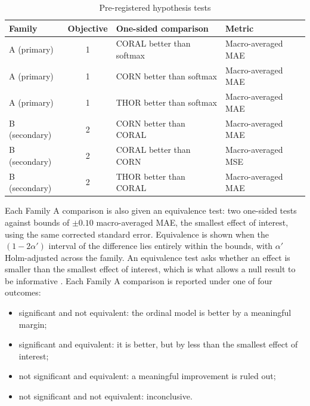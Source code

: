 \documentclass{icsthesis}
\begin{document}
\begin{mainmatter}
					\begin{table}[htbp]
					\vspace{4ex}
					\centering
						\caption{Pre-registered hypothesis tests}
						\label{tab:hypotheses}
						\begin{tabular}{lcll}
						\hline
						\hline
						Family & Objective & One-sided comparison & Metric \\ \hline
						A (primary) & 1 & CORAL better than softmax & Macro-averaged MAE \\
						A (primary) & 1 & CORN better than softmax & Macro-averaged MAE \\
						A (primary) & 1 & THOR better than softmax & Macro-averaged MAE \\
						B (secondary) & 2 & CORN better than CORAL & Macro-averaged MAE \\
						B (secondary) & 2 & CORAL better than CORN & Macro-averaged MSE \\
						B (secondary) & 2 & THOR better than CORAL & Macro-averaged MAE
						\\ \hline\hline
						\end{tabular}
					\vspace{4ex}
					\end{table}

					Each Family A comparison is also given an equivalence test: two one-sided tests
					against bounds of $\pm 0.10$ macro-averaged MAE, the smallest effect of
					interest, using the same corrected standard error. Equivalence is shown when the
					$(1-2\alpha')$ interval of the difference lies entirely within the bounds, with
					$\alpha'$ Holm-adjusted across the family. An equivalence test asks whether an
					effect is smaller than the smallest effect of interest, which is what allows a
					null result to be informative \citep{lakens2017,lakens2018}. Each Family A
					comparison is reported under one of four outcomes:

					\begin{itemize}
						\item significant and not equivalent: the ordinal model is better by a
							meaningful margin;
						\item significant and equivalent: it is better, but by less than the
							smallest effect of interest;
						\item not significant and equivalent: a meaningful improvement is ruled out;
						\item not significant and not equivalent: inconclusive.
					\end{itemize}


\end{mainmatter}
\end{document}
